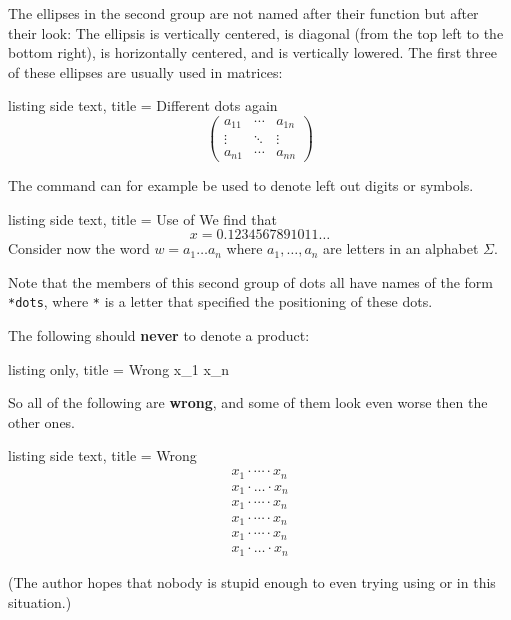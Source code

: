 \documentclass[a4paper, 10pt, headings=standardclasses, oneside, bibliography=totocnumbered]{scrbook}
\begin{document}
The ellipses in the second group are not named after their function but after their look:
The ellipsis  is vertically centered,  is diagonal (from the top left to the bottom right),  is horizontally centered, and  is vertically lowered.
The first three of these ellipses are usually used in matrices:
\begin{tcblisting}{listing side text, title = {Different dots again}}
\[
  \begin{pmatrix}
    a_{11} & \cdots & a_{1n} \\
    \vdots & \ddots & \vdots \\
    a_{n1} & \cdots & a_{nn}
  \end{pmatrix}
\]
\end{tcblisting}
The command  can for example be used to denote left out digits or symbols.
\begin{tcblisting}{listing side text, title = {Use of }}
We find that
\[
  x = 0.1234567891011\ldots
\]
Consider now the word $w = a_1 \ldots a_n$ where $a_1, \dotsc, a_n$ are letters in an alphabet $\Sigma$.
\end{tcblisting}
Note that the members of this second group of dots all have names of the form \texttt{*dots}, where \texttt{*} is a letter that specified the positioning of these dots.

The following should \textbf{never} to denote a product:
\begin{tcblisting}{listing only, title = {Wrong}}
x_1  \cdot x_n
\end{tcblisting}
So all of the following are \textbf{wrong}, and some of them look even worse then the other ones.
\begin{tcblisting}{listing side text, title = {Wrong}}
\begin{gather*}
  x_1 \cdot \dotsb \cdot x_n \\
  x_1 \cdot \dotsc \cdot x_n \\
  x_1 \cdot \dotsm \cdot x_n \\
  x_1 \cdot \dotsi \cdot x_n \\
  x_1 \cdot \cdots \cdot x_n \\
  x_1 \cdot \ldots \cdot x_n
\end{gather*}
\end{tcblisting}
(The author hopes that nobody is stupid enough to even trying using  or  in this situation.)
\end{document}

